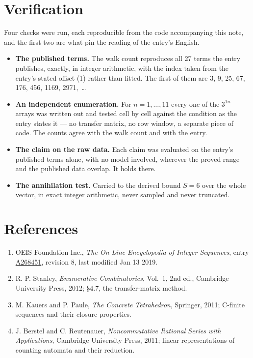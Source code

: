 \documentclass[11pt]{article}
\theoremstyle{definition}
\begin{document}
\section{Verification}

Four checks were run, each reproducible from the code accompanying this note, and the first two are what pin the reading of the entry's English.

\begin{itemize}

\item {\bfseries The published terms.} The walk count reproduces all 27 terms the entry publishes, exactly, in integer arithmetic, with the index taken from the entry's stated offset (1) rather than fitted. The first of them are 3, 9, 25, 67, 176, 456, 1169, 2971,~\dots

\item {\bfseries An independent enumeration.} For $n = 1,\dots,11$ every one of the $3^{1n}$ arrays was written out and tested cell by cell against the condition as the entry states it --- no transfer matrix, no row window, a separate piece of code. The counts agree with the walk count and with the entry.

\item {\bfseries The claim on the raw data.} Each claim was evaluated on the entry's published terms alone, with no model involved, wherever the proved range and the published data overlap. It holds there.

\item {\bfseries The annihilation test.} Carried to the derived bound $S = 6$ over the whole vector, in exact integer arithmetic, never sampled and never truncated.

\end{itemize}

\section{References}

\begin{enumerate}

\item OEIS Foundation Inc., \emph{The On-Line Encyclopedia of Integer Sequences}, entry \href{https://oeis.org/A268451}{A268451}, revision 8, last modified Jan 13 2019.

\item R. P. Stanley, \emph{Enumerative Combinatorics}, Vol.~1, 2nd ed., Cambridge University Press, 2012; \S4.7, the transfer-matrix method.

\item M. Kauers and P. Paule, \emph{The Concrete Tetrahedron}, Springer, 2011; C-finite sequences and their closure properties.

\item J. Berstel and C. Reutenauer, \emph{Noncommutative Rational Series with Applications}, Cambridge University Press, 2011; linear representations of counting automata and their reduction.

\end{enumerate}
\end{document}
